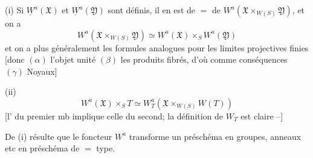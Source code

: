(i) Si $\underline W^a(\mathfrak X)$ et $\underline W^a(\mathfrak Y)$ sont définis, il en est de $=$ de $W^a(\mathfrak X\times_{W(S)}\mathfrak Y)$, et on a
\[
W^a(\mathfrak X\times_{W(S)}\mathfrak Y)\simeq
W^a(\mathfrak X)\times_S W^a(\mathfrak Y)
\]
et on a plus généralement  les formules analogues pour les limites projectives finies [donc $(\alpha)$ l'objet unité $(\beta)$ les produits fibrés, d'où comme conséquences $(\gamma)$ Noyaux]

(ii)
\[
W^a(\mathfrak X)\times_S T\simeq W_T^a(\mathfrak X\times_{W(S)}W(T))
\]
[l' du premier mb implique celle du second; la définition de $W_T$ est claire --]

De (i) résulte que le foncteur $W^a$ transforme un préschéma en groupes, anneaux etc en préschéma de $=$ type.
